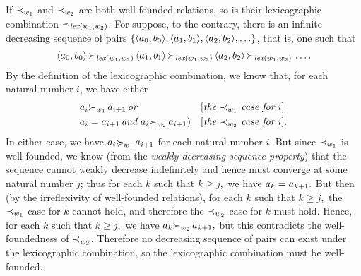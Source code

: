 \documentclass[runningheads]{llncs}
\DeclareMathOperator{\uand}{\emph{and}\,}
\DeclareMathOperator{\uor}{\emph{or}\,}
\DeclareMathOperator{\lex}{\emph{lex}}
\begin{document}
 If ${\prec}_{{w}_{1}}$ and ${\prec}_{{w}_{2}}$ are both well-founded relations, so is their lexicographic combination $\expsub{\prec}{\lex(\expsub{w}{1}, \expsub{w}{2})}$.  For suppose, to the contrary, there is an infinite decreasing sequence of pairs $\{\langle{a}_{0}, {b}_{0}\rangle, \langle{a}_{1}, {b}_{1}\rangle, \langle{a}_{2}, {b}_{2}\rangle, \ldots \}$, that is, one such that
  \[\langle\expsub{a}{0}, \expsub{b}{0}\rangle \, \expsub{\succ}{\lex(\expsub{w}{1}, \expsub{w}{2})} \, \langle\expsub{a}{1}, \expsub{b}{1}\rangle \, \allowbreak \expsub{\succ}{\lex(\expsub{w}{1}, \expsub{w}{2})} \,\allowbreak \langle\expsub{a}{2}, \expsub{b}{2}\rangle \, \expsub{\succ}{\lex(\expsub{w}{1}, \expsub{w}{2})} \,\ldots .\]   By the definition of the lexicographic combination, we know that, for each natural number $i$, we have either
   \begin{align*}
       & \expsub{a}{i} \expsub{\succ}{\expsub{w}{1}} \, \expsub{a}{i+1} \uor  && [\textit{the $\expsub{\prec}{\expsub{w}{1}}$ case for $i$}]\\ 
       & \expsub{a}{i} = \expsub{a}{i+1}  \uand
 \expsub{a}{i} \expsub{\succ}{\expsub{w}{2}} \,\expsub{a}{i+1})  && [\textit{the $\expsub{\prec}{\expsub{w}{2}}$ case for $i$}].
   \end{align*}
   \noindent In either case, we have ${a}_{i} {\succcurlyeq}_{{w}_{1}} \, {a}_{i+1}$ for each natural number $i$.  But since ${\prec}_{{w}_{1}}$ is well-founded, we know (from the \emph{weakly-decreasing sequence property}) that the sequence cannot weakly decrease indefinitely and hence must converge at some natural number $j$; thus for each $k$ such that $k \geq j,$ we have ${a}_{k}  =  {a}_{k+1}.$   But then (by the irreflexivity of well-founded relations), for each $k$ such that $k \geq j,$ the  ${\prec}_{{w}_{1}}$ case for $k$ cannot hold, and therefore the ${\prec}_{{w}_{2}}$ case for $k$ must hold.
   Hence, for each $k$ such that $k \geq j,$ we have ${a}_{k} {\succ}_{{w}_{2}} \,{a}_{k+1},$ but this contradicts the well-foundedness of ${\prec}_{{w}_{2}}$.  Therefore no decreasing sequence of pairs can exist under the lexicographic combination, so the lexicographic combination must be well-founded.
   
\end{document}
